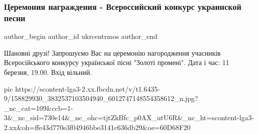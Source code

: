  
 
 
 
 
 
\subsubsection{Церемония награждения - Всероссийский конкурс украинской песни}
\label{sec:09_03_2021.fb.ukrcentrmos.1.konkurs_nagrazhdenie}
\ifcmt
 author_begin
   author_id ukrcentrmos
 author_end
\fi

\obeycr
Шановні друзі!
Запрошуємо Вас на церемонію нагородження учасників Всеросійського конкурсу української пісні "Золоті промені".
Дата і час: 11 березня, 19.00.
Вхід вільний.
\restorecr

\ifcmt
  pic https://scontent-lga3-2.xx.fbcdn.net/v/t1.6435-9/158829930_3832537103504940_6012747148554358612_n.jpg?_nc_cat=109&ccb=1-3&_nc_sid=730e14&_nc_ohc=tjtZkBfc_p0AX_utU6R&_nc_ht=scontent-lga3-2.xx&oh=ffe43d770e3f04946bbe3141c636db29&oe=60D68F20
\fi
